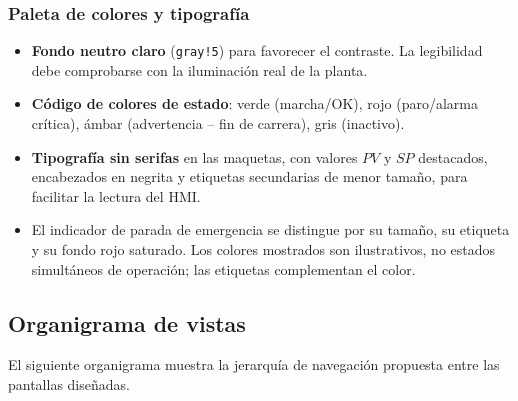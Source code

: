 \documentclass[11pt]{article}
\begin{document}
\begin{enumerate}[leftmargin=1.4em]
	\subsubsection*{Paleta de colores y tipografía}
	\begin{itemize}[leftmargin=1.2em, itemsep=1pt]
		\item \textbf{Fondo neutro claro} (\texttt{gray!5}) para favorecer el contraste. La legibilidad debe comprobarse con la iluminación real de la planta.
		\item \textbf{Código de colores de estado}: verde (marcha/OK), rojo (paro/alarma crítica), ámbar (advertencia -- fin de carrera), gris (inactivo).
		\item \textbf{Tipografía sin serifas} en las maquetas, con valores $PV$ y $SP$ destacados, encabezados en negrita y etiquetas secundarias de menor tamaño, para facilitar la lectura del HMI.
		\item El indicador de parada de emergencia se distingue por su tamaño, su etiqueta y su fondo rojo saturado. Los colores mostrados son ilustrativos, no estados simultáneos de operación; las etiquetas complementan el color.
	\end{itemize}
	
	\subsection{Organigrama de vistas}
	
	El siguiente organigrama muestra la jerarquía de navegación propuesta entre las pantallas diseñadas.
	
	\begin{center}
\end{center}
\end{enumerate}
\end{document}
